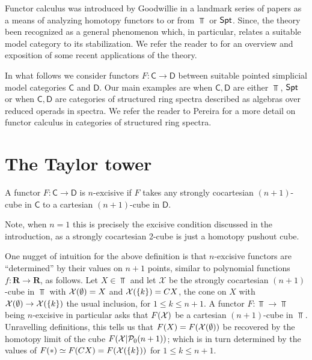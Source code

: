 


Functor calculus was introduced by Goodwillie in a landmark series of papers \cite{Goo-Calc1, Goo-Calc2,Goo-Calc3} as a means of analyzing homotopy functors to or from $\Top$ or $\mathsf{Spt}$. Since, the theory been recognized as a general phenomenon which, in particular, relates a suitable model category to its stabilization. We refer the reader to \cite{Handbook} for an overview and exposition of some recent applications of the theory. 

In what follows we consider functors $F\colon \mathsf{C}\to\mathsf{D}$ between suitable pointed simplicial model categories $\mathsf{C}$ and $\mathsf{D}$. Our main examples are when $\mathsf{C},\mathsf{D}$ are either $\Top$, $\mathsf{Spt}$ or when $\mathsf{C},\mathsf{D}$ are categories of structured ring spectra described as algebras over reduced operads in spectra. We refer the reader to Pereira \cite{Per-thesis} for a more detail on functor calculus in categories of structured ring spectra.

\section{The Taylor tower} 

\begin{definition}
A functor $F\colon \mathsf{C}\to\mathsf{D}$ is $n$-excisive if $F$ takes any strongly cocartesian $(n+1)$-cube in $\mathsf{C}$ to a cartesian $(n+1)$-cube in $\mathsf{D}$. 
\end{definition}
Note, when $n=1$ this is precisely the excisive condition discussed in the introduction, as a strongly cocartesian 2-cube is just a homotopy pushout cube. 

\begin{example} One nugget of intuition for the above definition is that $n$-excisive functors are ``determined'' by their values on $n+1$ points, similar to polynomial functions $f\colon \mathbf{R}\to\mathbf{R}$, as follows. Let $X\in \Top$ and let $\mathcal{X}$ be the strongly cocartesian $(n+1)$-cube in $\Top$ with $\mathcal{X}(\emptyset)=X$ and $\mathcal{X}(\{k\})= CX$, the cone on $X$ with $\mathcal{X}(\emptyset)\to \mathcal{X}(\{k\})$ the usual inclusion, for $1\leq k\leq n+1$. A functor $F\colon \Top\to \Top$ being $n$-excisive in particular asks that $F(\mathcal{X})$ be a cartesian $(n+1)$-cube in $\Top$. Unravelling definitions, this tells us that $F(X)=F(\mathcal{X}(\emptyset))$ be recovered by the homotopy limit of the cube $F(\mathcal{X}|\mathcal{P}_0(n+1))$; which is in turn determined by the values of $F(*)\simeq F(CX)=F(\mathcal{X}(\{k\}))$ for $1\leq k\leq n+1$.
\end{example}


